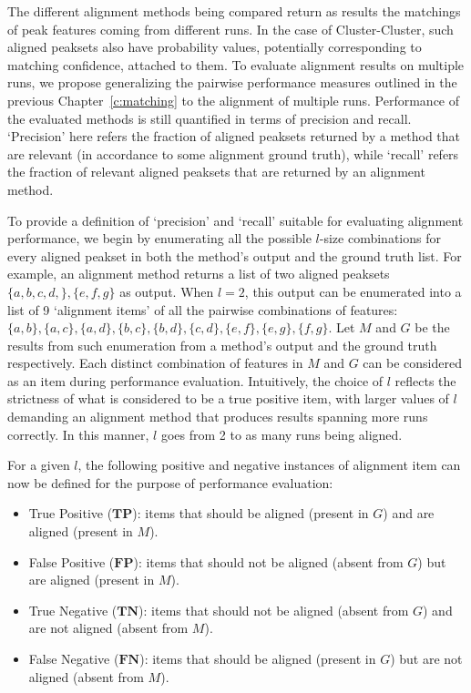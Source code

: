 The different alignment methods being compared return as results the matchings of peak features coming from different runs. In the case of Cluster-Cluster, such aligned peaksets also have probability values, potentially corresponding to matching confidence, attached to them. To evaluate alignment results on multiple runs, we propose generalizing the pairwise performance measures outlined in the previous Chapter~\ref{c:matching} to the alignment of multiple runs. Performance of the evaluated methods is still quantified in terms of precision and recall. `Precision' here refers the fraction of aligned peaksets returned by a method that are relevant (in accordance to some alignment ground truth), while `recall' refers the fraction of relevant aligned peaksets that are returned by an alignment method. 

To provide a definition of `precision' and `recall' suitable for evaluating alignment performance, we begin by enumerating all the possible $l$-size combinations for every aligned peakset in both the method's output and the ground truth list. For example, an alignment method returns a list of two aligned peaksets $\{a,b,c,d,\},\allowbreak\{e,f,g\}$ as output. When $l=2$, this output can be enumerated into a list of 9 `alignment items' of all the pairwise combinations of features: $\{a,b\},\allowbreak\{a,c\},\allowbreak\{a,d\},\allowbreak\{b,c\},\allowbreak\{b,d\},\allowbreak\{c,d\},\allowbreak\{e,f\},\allowbreak\{e,g\},\allowbreak\{f,g\}$. Let $M$ and $G$ be the results from such enumeration from a method's output and the ground truth respectively. Each distinct combination of features in $M$ and $G$ can be considered as an item during performance evaluation. Intuitively, the choice of $l$ reflects the strictness of what is considered to be a true positive item, with larger values of $l$ demanding an alignment method that produces results spanning more runs correctly. In this manner, $l$ goes from 2 to as many runs being aligned.

For a given $l$, the following positive and negative instances of alignment item can now be defined for the purpose of performance evaluation:
\begin{itemize}
\item True Positive ($\boldsymbol{TP}$): items that should be aligned (present in $G$) and are aligned (present in $M$).
\item False Positive ($\boldsymbol{FP}$): items that should not be aligned (absent from $G$) but are aligned (present in $M$).
\item True Negative ($\boldsymbol{TN}$): items that should not be aligned (absent from $G$) and are not aligned (absent from $M$).
\item False Negative ($\boldsymbol{FN}$): items that should be aligned (present in $G$) but are not aligned (absent from $M$).
\end{itemize}

